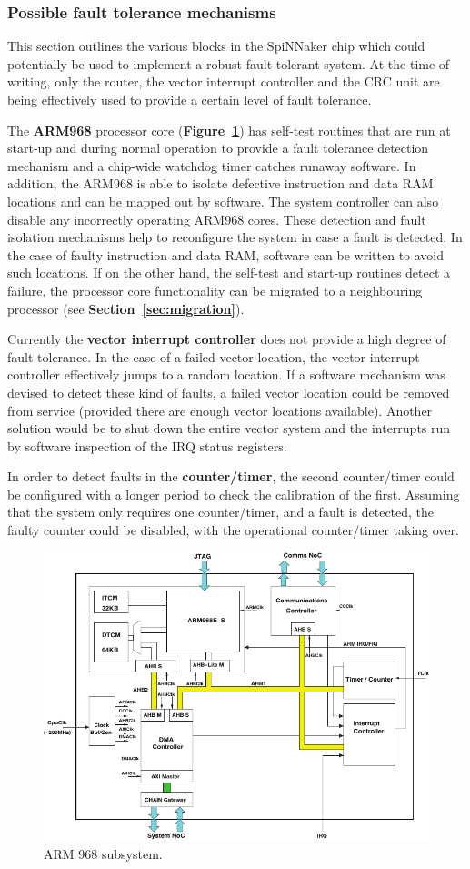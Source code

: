 \documentclass[a4paper, 11pt]{article}
\begin{document}
\subsubsection{Possible fault tolerance mechanisms}
This section outlines the various blocks in the SpiNNaker chip which could potentially be used to implement a robust fault tolerant system. At the time of writing, only the router, the vector interrupt controller and the CRC unit are being effectively used to provide a certain level of fault tolerance.

The \textbf{ARM968} processor core (\textbf{Figure~\ref{fig:arm968}}) has self-test routines that are run at start-up and during normal operation to provide a fault tolerance detection mechanism and a chip-wide watchdog timer catches runaway software. In addition, the ARM968 is able to isolate defective instruction and data RAM locations and can be mapped out by software. The system controller can also disable any incorrectly operating ARM968 cores. These detection and fault isolation mechanisms help to reconfigure the system in case a fault is detected. In the case of faulty instruction and data RAM, software can be written to avoid such locations. If on the other hand, the self-test and start-up routines detect a failure, the processor core functionality can be migrated to a neighbouring processor (see \textbf{Section~\ref{sec:migration}}).

Currently the \textbf{vector interrupt controller} does not provide a high degree of fault tolerance. In the case of a failed vector location, the vector interrupt controller effectively jumps to a random location. If a software mechanism was devised to detect these kind of faults, a failed vector location could be removed from service (provided there are enough vector locations available). Another solution would be to shut down the entire vector system and the interrupts run by software inspection of the IRQ status registers.

In order to detect faults in the \textbf{counter/timer}, the second counter/timer could be configured with a longer period to check the calibration of the first. Assuming that the system only requires one counter/timer, and a fault is detected, the faulty counter could be disabled, with the operational counter/timer taking over.

\begin{figure}[t]
	\centering
	\includegraphics[width=0.7\linewidth]{images/arm968_subsystem.pdf}
	\caption{ARM 968 subsystem.}
	\label{fig:arm968}
\end{figure}
\end{document}
